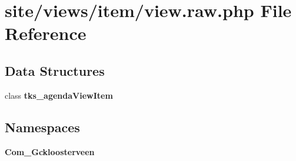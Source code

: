 \section{site/views/item/view.raw.\+php File Reference}
\label{view_8raw_8php}
\subsection*{Data Structures}
\begin{DoxyCompactItemize}
\item 
class \textbf{ tks\+\_\+agenda\+View\+Item}
\end{DoxyCompactItemize}
\subsection*{Namespaces}
\begin{DoxyCompactItemize}
\item 
 \textbf{ Com\+\_\+\+Gckloosterveen}
\end{DoxyCompactItemize}

